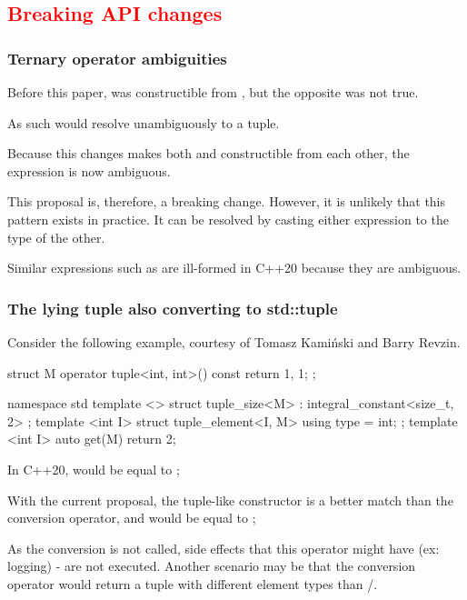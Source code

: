 \documentclass{wg21}
\begin{document}
\subsection{\textcolor{Red}{Breaking API changes}}

\subsubsection{Ternary operator ambiguities}

Before this paper,  was constructible from ,
but the opposite was not true.

As such  would resolve unambiguously to a tuple.

Because this changes makes both  and  constructible from each other,
the expression is now ambiguous.

This proposal is, therefore, a breaking change.
However, it is unlikely that this pattern exists in practice.
It can be resolved by casting either expression to the type of the other.

Similar expressions such as  are ill-formed in C++20 because they are ambiguous.

\subsubsection{The lying tuple also converting to std::tuple}

Consider the following example, courtesy of Tomasz Kamiński and Barry Revzin.

\begin{colorblock}
    struct M {
        operator tuple<int, int>() const { return {1, 1}; }
    };

    namespace std {
        template <> struct tuple_size<M> : integral_constant<size_t, 2> { };
        template <int I> struct tuple_element<I, M> { using type = int; };
        template <int I> auto get(M) { return 2; }
    }
\end{colorblock}

In C++20,  would be equal to ;

With the current proposal, the tuple-like constructor is a better match than the conversion operator, and
 would be equal to ;

As the conversion is not called, side effects that this operator might have (ex: logging) - are not executed.
Another scenario may be that the conversion operator would return a tuple with different element types than /.
\end{document}
